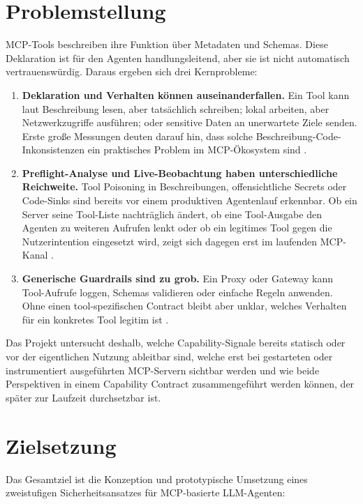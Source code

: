 \documentclass[pdflatex,sn-mathphys-num]{sn-jnl}%
\theoremstyle{thmstyleone}%
\theoremstyle{thmstyletwo}%
\theoremstyle{thmstylethree}%
\begin{document}
\section{Problemstellung}\label{sec:problem}

MCP-Tools beschreiben ihre Funktion \"uber Metadaten und Schemas. Diese Deklaration ist f\"ur den Agenten handlungsleitend, aber sie ist nicht automatisch vertrauensw\"urdig. Daraus ergeben sich drei Kernprobleme:

\begin{enumerate}
\item \textbf{Deklaration und Verhalten k\"onnen auseinanderfallen.} Ein Tool kann laut Beschreibung lesen, aber tats\"achlich schreiben; lokal arbeiten, aber Netzwerkzugriffe ausf\"uhren; oder sensitive Daten an unerwartete Ziele senden. Erste gro{\ss}e Messungen deuten darauf hin, dass solche Beschreibung-Code-Inkonsistenzen ein praktisches Problem im MCP-\"Okosystem sind \cite{misleading2026}.
\item \textbf{Preflight-Analyse und Live-Beobachtung haben unterschiedliche Reichweite.} Tool Poisoning in Beschreibungen, offensichtliche Secrets oder Code-Sinks sind bereits vor einem produktiven Agentenlauf erkennbar. Ob ein Server seine Tool-Liste nachtr\"aglich \"andert, ob eine Tool-Ausgabe den Agenten zu weiteren Aufrufen lenkt oder ob ein legitimes Tool gegen die Nutzerintention eingesetzt wird, zeigt sich dagegen erst im laufenden MCP-Kanal \cite{mcpitp2026}.
\item \textbf{Generische Guardrails sind zu grob.} Ein Proxy oder Gateway kann Tool-Aufrufe loggen, Schemas validieren oder einfache Regeln anwenden. Ohne einen tool-spezifischen Contract bleibt aber unklar, welches Verhalten f\"ur ein konkretes Tool legitim ist \cite{mcpguardian2025,miniscope2025}.
\end{enumerate}

Das Projekt untersucht deshalb, welche Capability-Signale bereits statisch oder vor der eigentlichen Nutzung ableitbar sind, welche erst bei gestarteten oder instrumentiert ausgef\"uhrten MCP-Servern sichtbar werden und wie beide Perspektiven in einem Capability Contract zusammengef\"uhrt werden k\"onnen, der sp\"ater zur Laufzeit durchsetzbar ist.

\section{Zielsetzung}\label{sec:goals}

Das Gesamtziel ist die Konzeption und prototypische Umsetzung eines zweistufigen Sicherheitsansatzes f\"ur MCP-basierte LLM-Agenten:
\end{document}
